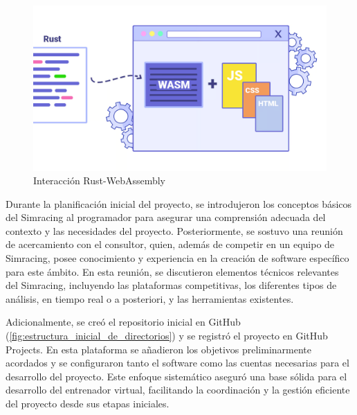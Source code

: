 \begin{figure}[H]
	\centering
	\includegraphics[width=0.7\linewidth]{./figs/herramientas/desarrollo/wasm_rust.png}
	\caption[Interacción Rust-WebAssembly]{Interacción Rust-WebAssembly \cite{garg2023}}
    \label{fig:rust_wasm}
\end{figure}

Durante la planificación inicial del proyecto, se introdujeron los conceptos básicos del Simracing al programador para asegurar una comprensión adecuada del contexto y las necesidades del proyecto. Posteriormente, se sostuvo una reunión de acercamiento con el consultor, quien, además de competir en un equipo de Simracing, posee conocimiento y experiencia en la creación de software específico para este ámbito. En esta reunión, se discutieron elementos técnicos relevantes del Simracing, incluyendo las plataformas competitivas, los diferentes tipos de análisis, en tiempo real o a posteriori, y las herramientas existentes.

Adicionalmente, se creó el repositorio inicial en GitHub (\autoref{fig:estructura_inicial_de_directorios}) y se registró el proyecto en GitHub Projects. En esta plataforma se añadieron los objetivos preliminarmente acordados y se configuraron tanto el software como las cuentas necesarias para el desarrollo del proyecto. Este enfoque sistemático aseguró una base sólida para el desarrollo del entrenador virtual, facilitando la coordinación y la gestión eficiente del proyecto desde sus etapas iniciales.

